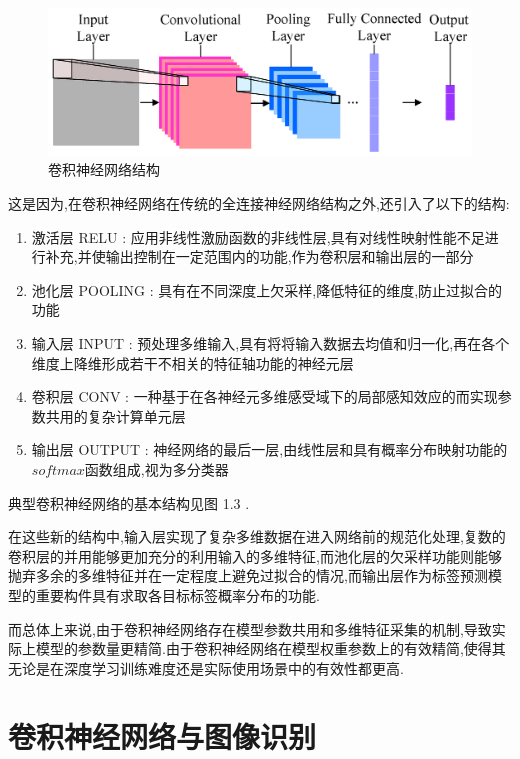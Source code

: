 \begin{figure}
\centering
\includegraphics[scale=1]{Figures/CNN3.png}
\caption{卷积神经网络结构}
\end{figure}

这是因为,在卷积神经网络在传统的全连接神经网络结构之外,还引入了以下的结构:
\begin{enumerate}
	\item 激活层 RELU : 应用非线性激励函数的非线性层,具有对线性映射性能不足进行补充,并使输出控制在一定范围内的功能,作为卷积层和输出层的一部分
	\item 池化层 POOLING : 具有在不同深度上欠采样,降低特征的维度,防止过拟合的功能
	\item 输入层 INPUT : 预处理多维输入,具有将将输入数据去均值和归一化,再在各个维度上降维形成若干不相关的特征轴功能的神经元层
	\item 卷积层 CONV : 一种基于在各神经元多维感受域下的局部感知效应的而实现参数共用的复杂计算单元层
	\item 输出层 OUTPUT : 神经网络的最后一层,由线性层和具有概率分布映射功能的$softmax$函数组成,视为多分类器
\end{enumerate}

典型卷积神经网络的基本结构见图 1.3 .

在这些新的结构中,输入层实现了复杂多维数据在进入网络前的规范化处理,复数的卷积层的并用能够更加充分的利用输入的多维特征,而池化层的欠采样功能则能够抛弃多余的多维特征并在一定程度上避免过拟合的情况,而输出层作为标签预测模型的重要构件具有求取各目标标签概率分布的功能.

而总体上来说,由于卷积神经网络存在模型参数共用和多维特征采集的机制,导致实际上模型的参数量更精简.由于卷积神经网络在模型权重参数上的有效精简,使得其无论是在深度学习训练难度还是实际使用场景中的有效性都更高.

\section{卷积神经网络与图像识别}


